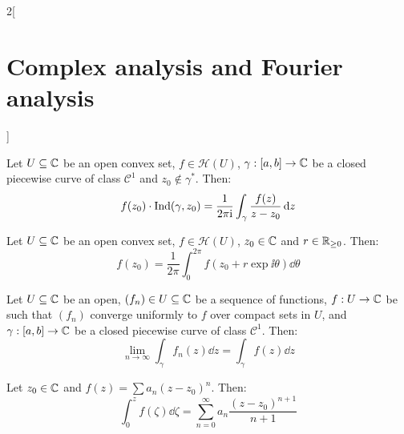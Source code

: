\documentclass[../../../main.tex]{subfiles}
\begin{document}
\begin{multicols}{2}[\section{Complex analysis and Fourier analysis}]
\begin{theorem}
  \end{theorem}
  \begin{theorem}
    Let $U\subseteq\mathbb{C}$ be an open convex set, $f\in\mathcal{H}(U)$, $\gamma:[a,b]\rightarrow\mathbb{C}$ be a closed piecewise curve of class $\mathcal{C}^1$ and $z_0\notin\gamma^*$. Then:
    $$f(z_0)\cdot\operatorname{Ind}(\gamma,z_0)=\frac{1}{2\pi\mathrm{i}}\int_\gamma\frac{f(z)}{z-z_0}\dd{z}$$
  \end{theorem}
  \begin{corollary}
    Let $U\subseteq\mathbb{C}$ be an open convex set, $f\in\mathcal{H}(U)$, $z_0\in\mathbb{C}$ and $r\in\mathbb{R}_{\geq 0}$. Then:
    $$f(z_0)=\frac{1}{2\pi}\int_0^{2\pi}f(z_0+r\exp{\ii\theta})\dd{\theta}$$
  \end{corollary}
  \begin{lemma}
    Let $U\subseteq\mathbb{C}$ be an open, $(f_n)\in U\subseteq\mathbb{C}$ be a sequence of functions, $f:U\rightarrow\mathbb{C}$ be such that $(f_n)$ converge uniformly to $f$ over compact sets in $U$, and $\gamma:[a,b]\rightarrow\mathbb{C}$ be a closed piecewise curve of class $\mathcal{C}^1$. Then:
    $$\lim_{n\to\infty}\int_\gamma f_n(z)\dd{z}=\int_\gamma f(z)\dd{z}$$
  \end{lemma}
  \begin{corollary}
    Let $z_0\in\mathbb{C}$ and $f(z)=\sum a_n{(z-z_0)}^n$. Then:
    $$\int_0^z f(\zeta)\dd{\zeta}=\sum_{n=0}^\infty a_n\frac{{(z-z_0)}^{n+1}}{n+1}$$
  \end{corollary}

\end{multicols}
\end{document}
